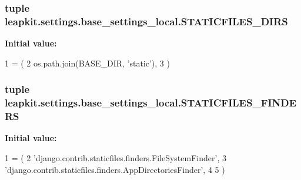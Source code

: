 \hypertarget{namespaceleapkit_1_1settings_1_1base__settings__local_a25a7639ff92dd41708846c8e55cf0cbe}{
\subsubsection[{S\-T\-A\-T\-I\-C\-F\-I\-L\-E\-S\-\_\-\-D\-I\-R\-S}]{\setlength{\rightskip}{0pt plus 5cm}tuple leapkit.\-settings.\-base\-\_\-settings\-\_\-local.\-S\-T\-A\-T\-I\-C\-F\-I\-L\-E\-S\-\_\-\-D\-I\-R\-S}}\label{namespaceleapkit_1_1settings_1_1base__settings__local_a25a7639ff92dd41708846c8e55cf0cbe}
{\bfseries Initial value\-:}
\begin{DoxyCode}
1 = (
2     os.path.join(BASE\_DIR, \textcolor{stringliteral}{'static'}),
3 )
\end{DoxyCode}
\hypertarget{namespaceleapkit_1_1settings_1_1base__settings__local_a205cb360c0af264fc6f364b5e3962b0e}{
\subsubsection[{S\-T\-A\-T\-I\-C\-F\-I\-L\-E\-S\-\_\-\-F\-I\-N\-D\-E\-R\-S}]{\setlength{\rightskip}{0pt plus 5cm}tuple leapkit.\-settings.\-base\-\_\-settings\-\_\-local.\-S\-T\-A\-T\-I\-C\-F\-I\-L\-E\-S\-\_\-\-F\-I\-N\-D\-E\-R\-S}}\label{namespaceleapkit_1_1settings_1_1base__settings__local_a205cb360c0af264fc6f364b5e3962b0e}
{\bfseries Initial value\-:}
\begin{DoxyCode}
1 = (
2     \textcolor{stringliteral}{'django.contrib.staticfiles.finders.FileSystemFinder'},
3     \textcolor{stringliteral}{'django.contrib.staticfiles.finders.AppDirectoriesFinder'},
4 
5 )
\end{DoxyCode}
